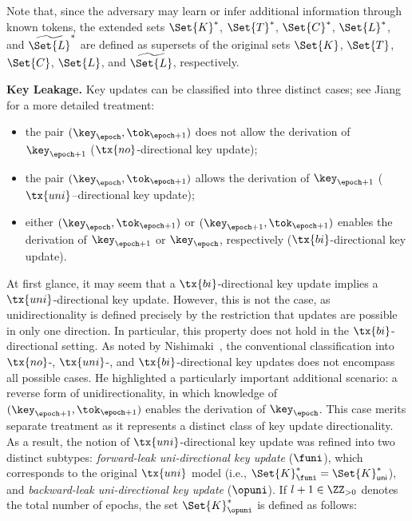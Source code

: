 \documentclass{fundam}
\begin{document}
Note that, since the adversary may learn or infer additional information through known tokens, the extended sets $\Set{K}^{*}$, $\Set{T}^{*}$, $\Set{C}^{*}$, $\Set{L}^{*}$, and $\widetilde{\Set{L}}^{*}$ are defined as supersets of the original sets $\Set{K}$, $\Set{T}$, $\Set{C}$, $\Set{L}$, and $\widetilde{\Set{L}}$, respectively.


\vspace{0.3cm}
\noindent\textbf{Key Leakage.} Key updates can be classified into three distinct cases; see Jiang~\cite{jiang2020} for a more detailed treatment:
\begin{itemize}
	\item the pair $(\key_{\epoch}, \tok_{\epoch+1})$ does not allow the derivation of $\key_{\epoch+1}$ ($\tx{no}$-directional key update);
	\item the pair $(\key_{\epoch}, \tok_{\epoch+1})$ allows the derivation of $\key_{\epoch+1}$ ($\tx{uni}$--directional key update);
	\item either $(\key_{\epoch}, \tok_{\epoch+1})$ or $(\key_{\epoch+1}, \tok_{\epoch+1})$ enables the derivation of $\key_{\epoch+1}$ or $\key_{\epoch}$, respectively ($\tx{bi}$-directional key update).
\end{itemize}



At first glance, it may seem that a $\tx{bi}$-directional key update implies a $\tx{uni}$-directional key update. However, this is not the case, as unidirectionality is defined precisely by the restriction that updates are possible in only one direction. In particular, this property does not hold in the $\tx{bi}$-directional setting.
%
As noted by Nishimaki~\cite{nishimaki2022direction}, the conventional classification into $\tx{no}$-, $\tx{uni}$-, and $\tx{bi}$-directional key updates does not encompass all possible cases. He highlighted a particularly important additional scenario: a reverse form of unidirectionality, in which knowledge of $(\key_{\epoch+1}, \tok_{\epoch+1})$ enables the derivation of $\key_{\epoch}$. This case merits separate treatment as it represents a distinct class of key update directionality. As a result, the notion of $\tx{uni}$-directional key update was refined into two distinct subtypes: \textit{forward-leak uni-directional key update} ($\funi$), which corresponds to the original $\tx{uni}$ model (i.e., $\Set{K}_{\funi}^{*} = \Set{K}_{\mathsf{uni}}^{*}$), and \textit{backward-leak uni-directional key update} ($\opuni$). If $l+1 \in \ZZ_{>0}$ denotes the total number of epochs, the set $\Set{K}_{\opuni}^{*}$ is defined as follows:
\end{document}
